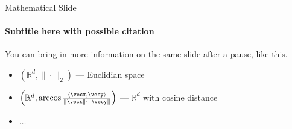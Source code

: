 \documentclass[9pt,aspectratio=169]{beamer}
\begin{document}
\begin{frame}{Mathematical Slide}
    \framesubtitle{Subtitle here with possible citation~\autocite{bhatia2010survey}}
    
    \vspace{3mm}
    \pause
    You can bring in more information on the same slide after a pause, like this.
    \begin{itemize}
        \item $(\mathbb{R}^d, \| \cdot \|_2)$ --- Euclidian space
        \item $\left(\mathbb{R}^d,\arccos\frac{\langle \vecx, \vecy \rangle}{\| \vecx \| \cdot \| \vecy \|}\right)$ --- $\mathbb{R}^d$ with cosine distance
        \item $\ldots$
    \end{itemize}
    
\end{frame}
\end{document}
